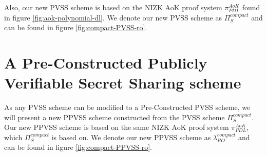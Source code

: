 Also, our new PVSS scheme is based on the NIZK AoK proof system $\pi_{PDL}^{AoK}$ found 
in figure \ref{fig:aok-polynomial-dl}. We denote our new PVSS scheme as $\Pi_{S}^{compact}$ and can 
be found in figure \ref{fig:compact-PVSS-ro}.



\section{A Pre-Constructed Publicly Verifiable Secret Sharing scheme}
\label{sec:PPVSS}
As any PVSS scheme can be modified to a Pre-Constructed PVSS scheme, we will present a new 
PPVSS scheme constructed from the PVSS scheme $\Pi_{S}^{compact}$. Our new PPVSS scheme is 
based on the same NIZK AoK proof system $\pi_{PDL}^{AoK}$, which $\Pi_{S}^{compact}$ is based on. 
We denote our new PPVSS scheme as $\lambda_{RO}^{compact}$ and can be found in figure 
\ref{fig:compact-PPVSS-ro}.



